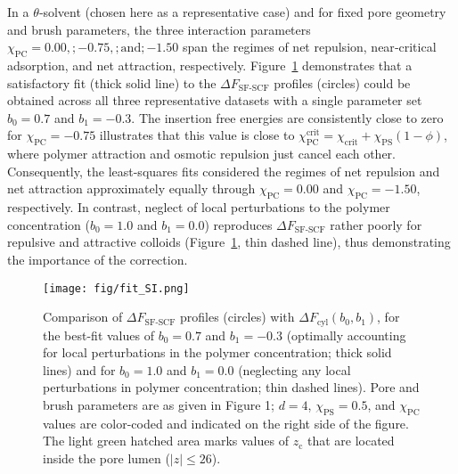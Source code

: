 \documentclass[10pt, a4paper]{article}
\begin{document}
\begin{multicols}{2}

In a $\theta$‑solvent (chosen here as a representative case) and for fixed pore geometry and brush parameters, the three interaction parameters
$\chi_{\text{PC}} = 0.00,; -0.75,; \text{and}; -1.50$ span the regimes of net repulsion, near‑critical adsorption, and net attraction, respectively.
Figure~\ref{fig:fit_SI} demonstrates that a satisfactory fit (thick solid line) to the $\Delta F_{\text{SF-SCF}}$ profiles (circles) could be obtained across all three representative datasets with a single parameter set $b_0 = 0.7$ and $b_1 = -0.3$.
The insertion free energies are consistently close to zero for $\chi_{\text{PC}} = -0.75$ illustrates that this value is close to $\chi_{\text{PC}}^{\text{crit}} = \chi_{\text{crit}} + \chi_{\text{PS}} (1 - \phi)$, where polymer attraction and osmotic repulsion just cancel each other.
Consequently, the least-squares fits considered the regimes of net repulsion and net attraction approximately equally through $\chi_{\text{PC}} = 0.00$ and $\chi_{\text{PC}} = -1.50$, respectively.
In contrast, neglect of local perturbations to the polymer concentration ($b_0 = 1.0$ and $b_1 = 0.0$) reproduces $\Delta F_{\text{SF-SCF}}$ rather poorly for repulsive and attractive colloids (Figure~\ref{fig:fit_SI}, thin dashed line), thus demonstrating the importance of the correction.

\begin{figure}[H]
    \centering
    \texttt{[image: fig/fit\_SI.png]}
    \caption{
    Comparison of $\Delta F_{\text{SF-SCF}}$ profiles (circles) with $\Delta F_{\text{cyl}}(b_0,b_1)$, for the best-fit values of $b_0 = 0.7$ and $b_1 = -0.3$ (optimally accounting for local perturbations in the polymer concentration; thick solid lines) and for $b_0 = 1.0$ and $b_1 = 0.0$ (neglecting any local perturbations in polymer concentration; thin dashed lines).
    Pore and brush parameters are as given in Figure 1; $d = 4$, $\chi_{\text{PS}} = 0.5$, and $\chi_{\text{PC}}$ values are color-coded and indicated on the right side of the figure.
    The light green hatched area marks values of $z_{\text{c}}$ that are located inside the pore lumen ($|z| \leq 26$).
    }
    \label{fig:fit_SI}
\end{figure}


\end{multicols}
\end{document}
